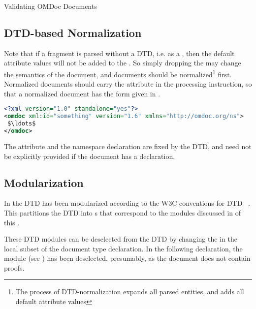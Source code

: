 \begin{module}[id=validating]
\begin{omgroup}[id=validating]{Validating OMDoc Documents}
\subsection{DTD-based Normalization}\label{subsec:dtd-normalization}  
  Note that if a {\omdoc} fragment is parsed without a DTD, i.e. as a
  {} {\xml} {}, then the default attribute
  values will not be added to the {\xml}
  {}. So simply dropping the {}
  may change the semantics of the document, and {\omdoc} documents should be
  normalized\footnote{The process of DTD-normalization expands all parsed {\xml} entities,
    and adds all default attribute values} first.  Normalized
  {\omdoc} documents should carry the {} attribute in the
  {\xml} processing instruction, so that a normalized {\omdoc} document has the form given
  in {}.

\begin{lstlisting}[label=lst:normalized,language=XML,morekeywords={omdoc},mathescape,
  caption={A normalized {\omdoc} document without DTD},index={xml,omdoc}]
<?xml version="1.0" standalone="yes"?>
<omdoc xml:id="something" version="1.6" xmlns="http://omdoc.org/ns">
 $\ldots$
</omdoc>
\end{lstlisting}

The attribute {} and the namespace declaration
{} are fixed by the DTD, and need not be explicitly provided if the
document has a {} declaration.



\subsection{Modularization}\label{subsec:modularization}

In {} the DTD has been modularized according to the W3C conventions for DTD
{}~\cite{AltBou:mox01}. This partitions the DTD into
{s} that correspond to the {\omdoc} modules discussed in
{} of this {\report}.

These DTD modules can be deselected from the {\omdoc} DTD by changing the {} in the local subset of the
document type declaration. In the following declaration, the module {} (see
{}) has been deselected, presumably, as the document does not contain
proofs.


\end{omgroup}
\end{module}
